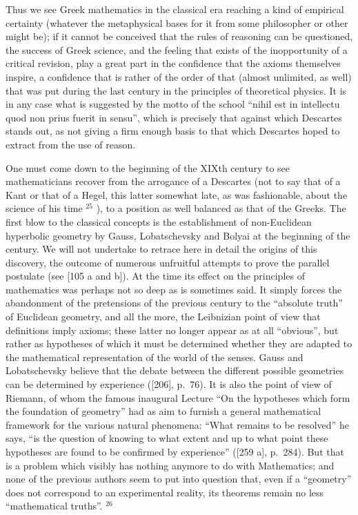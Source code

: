 Thus we see Greek mathematics in the classical era reaching a kind of empirical certainty (whatever the metaphysical bases for it from some philosopher or other might be); if it cannot be conceived that the rules of reasoning can be questioned, the success of Greek science, and the feeling that exists of the inopportunity of a critical revision, play a great part in the confidence that the axioms themselves inspire, a confidence that is rather of the order of that (almost unlimited, as well) that was put during the last century in the principles of theoretical physics. It is in any case what is suggested by the motto of the school ``nihil est in intellectu quod non prius fuerit in sensu'', which is precisely that against which Descartes stands out, as not giving a firm enough basis to that which Descartes hoped to extract from the use of reason.

One must come down to the beginning of the XIXth century to see mathematicians recover from the arrogance of a Descartes (not to say that of a Kant or that of a Hegel, this latter somewhat late, as was fashionable, about the science of his time \(^{25}\) ), to a position as well balanced as that of the Greeks. The first blow to the classical concepts is the establishment of non-Euclidean hyperbolic geometry by Gauss, Lobatschevsky and Bolyai at the beginning of the century. We will not undertake to retrace here in detail the origins of this discovery, the outcome of numerous unfruitful attempts to prove the parallel postulate (see {[}105 a and b{]}). At the time its effect on the principles of mathematics was perhaps not so deep as is sometimes said. It simply forces the abandonment of the pretensions of the previous century to the ``absolute truth'' of Euclidean geometry, and all the more, the Leibnizian point of view that definitions imply axioms; these latter no longer appear as at all ``obvious'', but rather as hypotheses of which it must be determined whether they are adapted to the mathematical representation of the world of the senses. Gauss and Lobatschevsky believe that the debate between the different possible geometries can be determined by experience ({[}206{]}, p.~76). It is also the point of view of Riemann, of whom the famous inaugural Lecture ``On the hypotheses which form the foundation of geometry'' had as aim to furnish a general mathematical framework for the various natural phenomena: ``What remains to be resolved'' he says, ``is the question of knowing to what extent and up to what point these hypotheses are found to be confirmed by experience'' ({[}259 a{]}, p.~284). But that is a problem which visibly has nothing anymore to do with Mathematics; and none of the previous authors seem to put into question that, even if a ``geometry'' does not correspond to an experimental reality, its theorems remain no less ``mathematical truths''. \(^{26}\)

